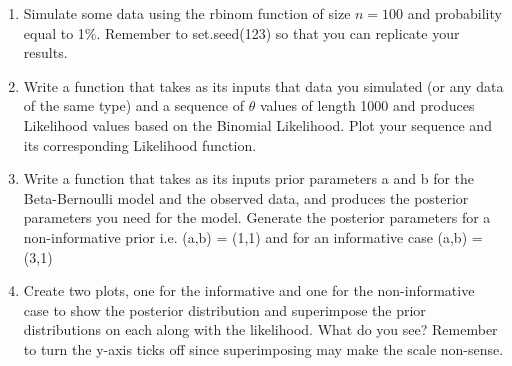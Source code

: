 \documentclass{article}
\begin{document}
\begin{enumerate}
\item{Simulate some data using the \textsf{rbinom} function of size $n = 100$ and probability equal to 1\%. Remember to \textsf{set.seed(123)} so that you can replicate your results.}
\item{Write a function that takes as its inputs that data you simulated (or any data of the same type) and a sequence of $\theta$ values of length 1000 and produces Likelihood values based on the Binomial Likelihood. Plot your sequence and its corresponding Likelihood function.}
\item{Write a function that takes as its inputs  prior parameters \textsf{a} and \textsf{b} for the Beta-Bernoulli model and the observed data, and produces the posterior parameters you need for the model. Generate the posterior parameters for a non-informative prior i.e. \textsf{(a,b) = (1,1)} and for an informative case \textsf{(a,b) = (3,1)}}
\item{Create two plots, one for the informative and one for the non-informative case to show the posterior distribution and superimpose the prior distributions on each along with the likelihood. What do you see? Remember to turn the y-axis ticks off since superimposing may make the scale non-sense.}
\end{enumerate}
\end{document}
